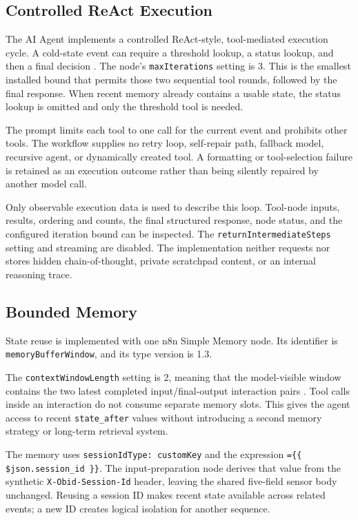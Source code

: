 \subsection{Controlled ReAct Execution}\label{subsec:impl-react}

The AI Agent implements a controlled ReAct-style, tool-mediated execution
cycle. A cold-state event can require a threshold lookup, a status lookup, and
then a final decision \cite{yao2023react}. The node's \texttt{maxIterations} setting is 3. This is
the smallest installed bound that permits those two sequential tool rounds,
followed by the final response. When recent memory already contains a usable
state, the status lookup is omitted and only the threshold tool is needed.

The prompt limits each tool to one call for the current event and prohibits
other tools. The workflow supplies no retry loop, self-repair path, fallback
model, recursive agent, or dynamically created tool. A formatting or
tool-selection failure is retained as an execution outcome rather than being
silently repaired by another model call.

Only observable execution data is used to describe this loop. Tool-node
inputs, results, ordering and counts, the final structured response, node
status, and the configured iteration bound can be inspected.
The \texttt{returnIntermediateSteps} setting and streaming are disabled. The
implementation neither requests nor stores hidden chain-of-thought, private
scratchpad content, or an internal reasoning trace.

\subsection{Bounded Memory}\label{subsec:impl-memory}

State reuse is implemented with one n8n Simple Memory node. Its identifier is
\texttt{memoryBufferWindow}, and its type version is 1.3.

The \texttt{contextWindowLength} setting is 2, meaning that the model-visible window
contains the two latest completed input/final-output interaction pairs
\cite{n8nSimpleMemory,wang2024surveyagents,liu2024lostmiddle}. Tool
calls inside an interaction do not consume separate memory slots. This gives
the agent access to recent \texttt{state\_after} values without introducing a
second memory strategy or long-term retrieval system.

The memory uses \texttt{sessionIdType: customKey} and the expression
\texttt{=\{\{ \$json.session\_id \}\}}. The input-preparation node derives
that value from the synthetic \texttt{X-Obid-Session-Id} header, leaving the
shared five-field sensor body unchanged. Reusing a session ID makes recent
state available across related events; a new ID creates logical isolation for
another sequence.

